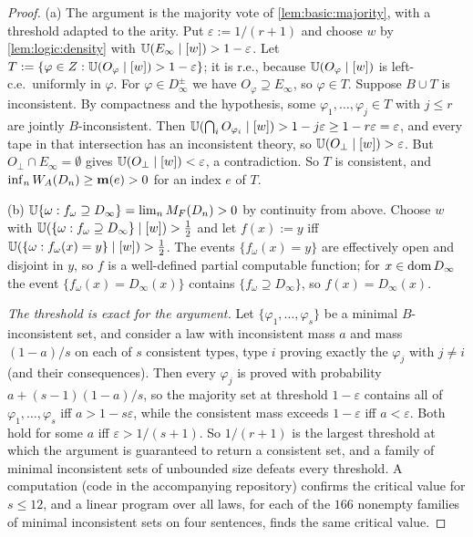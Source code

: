 \begin{proof}
(a) The argument is the majority vote of \cref{lem:basic:majority}, with a threshold adapted to the arity. Put $\varepsilon:=1/(r+1)$ and choose $w$ by \cref{lem:logic:density} with $\mathbb{U}(E_\infty\mid[w])>1-\varepsilon$. Let $T:=\{\varphi\in Z:\mathbb{U}(O_\varphi\mid[w])>1-\varepsilon\}$; it is r.e., because $\mathbb{U}(O_\varphi\mid[w])$ is left-c.e.\ uniformly in $\varphi$. For $\varphi\in D_\infty^\pm$ we have $O_\varphi\supseteq E_\infty$, so $\varphi\in T$. Suppose $B\cup T$ is inconsistent. By compactness and the hypothesis, some $\varphi_1,\dots,\varphi_j\in T$ with $j\le r$ are jointly $B$-inconsistent. Then $\mathbb{U}(\bigcap_iO_{\varphi_i}\mid[w])>1-j\varepsilon\ge1-r\varepsilon=\varepsilon$, and every tape in that intersection has an inconsistent theory, so $\mathbb{U}(O_\bot\mid[w])>\varepsilon$. But $O_\bot\cap E_\infty=\emptyset$ gives $\mathbb{U}(O_\bot\mid[w])<\varepsilon$, a contradiction. So $T$ is consistent, and $\inf_nW_{A}(D_n)\ge\mathbf{m}(e)>0$ for an index $e$ of $T$.

(b) $\mathbb{U}\{\omega:f_\omega\supseteq D_\infty\}=\lim_nM_{F}(D_n)>0$ by continuity from above. Choose $w$ with $\mathbb{U}(\{\omega:f_\omega\supseteq D_\infty\}\mid[w])>\frac12$ and let $f(x):=y$ iff $\mathbb{U}(\{\omega:f_\omega(x)=y\}\mid[w])>\frac12$. The events $\{f_\omega(x)=y\}$ are effectively open and disjoint in $y$, so $f$ is a well-defined partial computable function; for $x\in\operatorname{dom} D_\infty$ the event $\{f_\omega(x)=D_\infty(x)\}$ contains $\{f_\omega\supseteq D_\infty\}$, so $f(x)=D_\infty(x)$.

\emph{The threshold is exact for the argument.} Let $\{\varphi_1,\dots,\varphi_s\}$ be a minimal $B$-inconsistent set, and consider a law with inconsistent mass $a$ and mass $(1-a)/s$ on each of $s$ consistent types, type $i$ proving exactly the $\varphi_j$ with $j\ne i$ (and their consequences). Then every $\varphi_j$ is proved with probability $a+(s-1)(1-a)/s$, so the majority set at threshold $1-\varepsilon$ contains all of $\varphi_1,\dots,\varphi_s$ iff $a>1-s\varepsilon$, while the consistent mass exceeds $1-\varepsilon$ iff $a<\varepsilon$. Both hold for some $a$ iff $\varepsilon>1/(s+1)$. So $1/(r+1)$ is the largest threshold at which the argument is guaranteed to return a consistent set, and a family of minimal inconsistent sets of unbounded size defeats every threshold. A computation (code in the accompanying repository) confirms the critical value for $s\le12$, and a linear program over all laws, for each of the $166$ nonempty families of minimal inconsistent sets on four sentences, finds the same critical value.
\end{proof}

